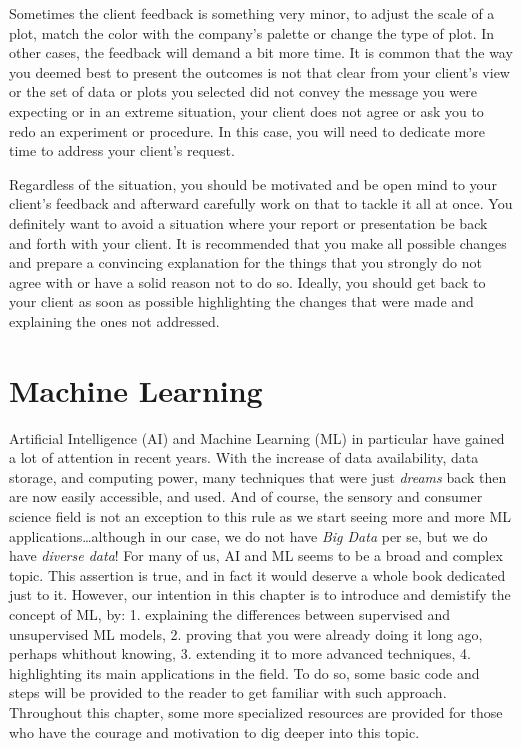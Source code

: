 \documentclass[
]{krantz}
\renewenvironment{quote}{\begin{VF}}{\end{VF}}
\begin{document}
Sometimes the client feedback is something very minor, to adjust the scale of a plot, match the color with the company's palette or change the type of plot. In other cases, the feedback will demand a bit more time. It is common that the way you deemed best to present the outcomes is not that clear from your client's view or the set of data or plots you selected did not convey the message you were expecting or in an extreme situation, your client does not agree or ask you to redo an experiment or procedure. In this case, you will need to dedicate more time to address your client's request.

Regardless of the situation, you should be motivated and be open mind to your client's feedback and afterward carefully work on that to tackle it all at once. You definitely want to avoid a situation where your report or presentation be back and forth with your client. It is recommended that you make all possible changes and prepare a convincing explanation for the things that you strongly do not agree with or have a solid reason not to do so. Ideally, you should get back to your client as soon as possible highlighting the changes that were made and explaining the ones not addressed.

\hypertarget{machine-learning}{%
\chapter{Machine Learning}\label{machine-learning}}

\begin{quote}
Artificial Intelligence (AI) and Machine Learning (ML) in particular have gained a lot of attention in recent years. With the increase of data availability, data storage, and computing power, many techniques that were just \emph{dreams} back then are now easily accessible, and used. And of course, the sensory and consumer science field is not an exception to this rule as we start seeing more and more ML applications\ldots although in our case, we do not have \emph{Big Data} per se, but we do have \emph{diverse data}!
For many of us, AI and ML seems to be a broad and complex topic. This assertion is true, and in fact it would deserve a whole book dedicated just to it. However, our intention in this chapter is to introduce and demistify the concept of ML, by:
1. explaining the differences between supervised and unsupervised ML models,
2. proving that you were already doing it long ago, perhaps whithout knowing,
3. extending it to more advanced techniques,
4. highlighting its main applications in the field.
To do so, some basic code and steps will be provided to the reader to get familiar with such approach. Throughout this chapter, some more specialized resources are provided for those who have the courage and motivation to dig deeper into this topic.
\end{quote}
\end{document}
